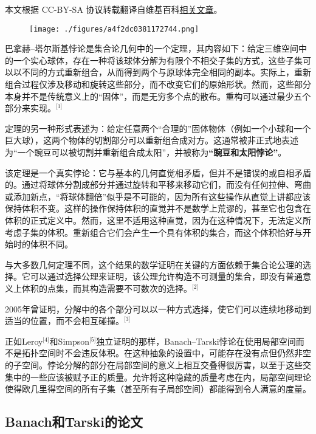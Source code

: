 
本文根据 CC-BY-SA 协议转载翻译自维基百科\href{https://en.wikipedia.org/wiki/Banach\%E2\%80\%93Tarski_paradox}{相关文章}。

\begin{figure}[ht]
\centering
\texttt{[image: ./figures/a4f2dc0381172744.png]}
\caption{} \label{fig_BTS_1}
\end{figure}
巴拿赫–塔尔斯基悖论是集合论几何中的一个定理，其内容如下：给定三维空间中的一个实心球体，存在一种将该球体分解为有限个不相交子集的方式，这些子集可以以不同的方式重新组合，从而得到两个与原球体完全相同的副本。实际上，重新组合过程仅涉及移动和旋转这些部分，而不改变它们的原始形状。然而，这些部分本身并不是传统意义上的“固体”，而是无穷多个点的散布。重构可以通过最少五个部分来实现。\(^\text{[1]}\)

定理的另一种形式表述为：给定任意两个“合理的”固体物体（例如一个小球和一个巨大球），这两个物体的切割部分可以重新组合成对方。这通常被非正式地表述为“一个豌豆可以被切割并重新组合成太阳”，并被称为\textbf{“豌豆和太阳悖论”}。

该定理是一个真实悖论：它与基本的几何直觉相矛盾，但并不是错误的或自相矛盾的。通过将球体分割成部分并通过旋转和平移来移动它们，而没有任何拉伸、弯曲或添加新点，“将球体翻倍”似乎是不可能的，因为所有这些操作从直觉上讲都应该保持体积不变。这样的操作保持体积的直觉并不是数学上荒谬的，甚至它也包含在体积的正式定义中。然而，这里不适用这种直觉，因为在这种情况下，无法定义所考虑子集的体积。重新组合它们会产生一个具有体积的集合，而这个体积恰好与开始时的体积不同。

与大多数几何定理不同，这个结果的数学证明在关键的方面依赖于集合论公理的选择。它可以通过选择公理来证明，该公理允许构造不可测量的集合，即没有普通意义上体积的点集，而其构造需要不可数次的选择。\(^\text{[2]}\)

2005年曾证明，分解中的各个部分可以以一种方式选择，使它们可以连续地移动到适当的位置，而不会相互碰撞。\(^\text{[3]}\)

正如Leroy\(^\text{[4]}\)和Simpson\(^\text{[5]}\)独立证明的那样，Banach–Tarski悖论在使用局部空间而不是拓扑空间时不会违反体积。在这种抽象的设置中，可能存在没有点但仍然非空的子空间。悖论分解的部分在局部空间的意义上相互交叠得很厉害，以至于这些交集中的一些应该被赋予正的质量。允许将这种隐藏的质量考虑在内，局部空间理论使得欧几里得空间的所有子集（甚至所有子局部空间）都能得到令人满意的度量。
\subsection{Banach和Tarski的论文}


